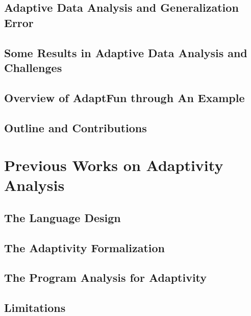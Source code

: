 \documentclass[12pt, letterpaper]{report}   %
\newcommand{\THESYSTEM}{\textsf{AdaptFun}}
\begin{document}
\section{Adaptive Data Analysis and Generalization Error}
\label{sec:adapt-background}


\section{Some Results in Adaptive Data Analysis and Challenges}
\label{sec:adapt-motivation}


\section{Overview of {\THESYSTEM} through An Example}
\label{sec:adapt-overview}


\section{Outline and Contributions}
\label{sec:adapt-outline}


\chapter{Previous Works on Adaptivity Analysis}
\label{sec:prework}

%
\section{The Language Design}
\label{sec:prework-language}

%
\section{The Adaptivity Formalization}
\label{sec:prework-formalization}

%
\section{The Program Analysis for Adaptivity}
\label{sec:prework-static}


\section{Limitations}
\label{sec:prework-limitations}

\end{document}
